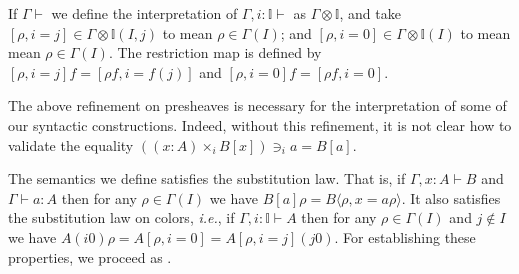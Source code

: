 \documentclass[english]{PaperTools/latex/lipics}
\newcommand\CTimes[2]{(#2) ×_{#1}}
\newcommand\op[1]{∋_{#1}}
\def\ie{\textit{i.e.}}
\begin{document}
\smallskip
If $Γ⊢$ we define the interpretation of $Γ,i:𝕀 ⊢$ as $Γ⊗𝕀$,
and take $[ρ,i=j] ∈ Γ⊗𝕀(I,j)$ to mean $ρ ∈ Γ(I)$;
and $[ρ,i=0] ∈ Γ⊗𝕀(I)$ to mean mean $ρ ∈ Γ(I)$.
The restriction map is defined by $[ρ,i=j]f = [ρf,i=f(j)]$
and $[ρ,i=0]f = [ρf,i=0]$.

\bigskip
The above refinement on presheaves is necessary for the interpretation
of some of our syntactic constructions.  Indeed, without this refinement,
it is not clear how to validate the equality
${{(\CTimes i {x:A} B[x])} \op i a = B[a]}$.

\bigskip
The semantics we define satisfies the substitution law. That is, if $Γ,x:A ⊢ B$
and $Γ ⊢ a:A$ then for any $ρ ∈ Γ(I)$ we have
$B[a]ρ = B⟨ρ,x=aρ⟩$.
It also satisfies the substitution law on colors, \ie, if $Γ,i:𝕀 ⊢ A$
then for any $ρ ∈ Γ(I)$ and $j ∉ I$ we have
$A(i 0)ρ = A[ρ,i=0] = A[ρ,i=j](j 0)$.
For establishing these properties, we proceed as \citet{Aczel98onrelating}.
\end{document}
